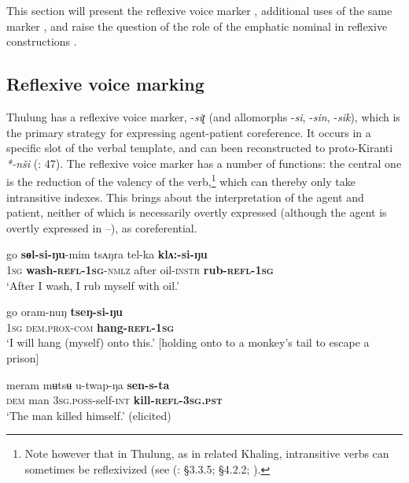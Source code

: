 \documentclass[output=paper]{langscibook}
\begin{document}
This section will present the reflexive voice marker , additional uses of the same marker , and raise the question of the role of the emphatic nominal in reflexive constructions .

\subsection{Reflexive voice marking}
\label{sec:Lahaussois:3.1}

Thulung has a reflexive voice marker, -\textit{siʈ} (and allomorphs -\textit{si}, -\textit{sin}, -\textit{sik}), which is the primary strategy for expressing agent-patient coreference. It occurs in a specific slot of the verbal template, and can been reconstructed to proto-Kiranti \textit{*-nši} (\citealt{VanDriem1990}: 47).  The reflexive voice marker has a number of functions: the central one is the reduction of the valency of the verb,\footnote{Note however that in Thulung, as in related Khaling, intransitive verbs can sometimes be reflexivized (see (\citealt{Lahaussois2016}: §3.3.5; \citealt{JacquesEtAl2016}§4.2.2; \citealt{Jacques2015}).} which can thereby only take intransitive indexes. This brings about the interpretation of the agent and patient, neither of which is necessarily overtly expressed (although the agent is overtly expressed in --), as coreferential.

\ea%
    \label{ex:Lahaussois:7}
    \gll go \textbf{sɵl-si-ŋu}{}-mim tsʌŋra tel-ka \textbf{klʌ:-si-ŋu}\\
        \textsc{1sg} \textbf{wash-\textsc{refl-1sg}}\textsc{{}-nmlz} after oil-\textsc{instr} \textbf{rub-\textsc{refl-1sg}}\\
    \glt ‘After I wash, I rub myself with oil.'
    \z

           
\ea%
    \label{ex:Lahaussois:8}
    \gll go oram-nuŋ \textbf{tseŋ-si-ŋu}\\
        \textsc{1sg} \textsc{dem.prox-com}   \textbf{hang-\textsc{refl-1sg}}\\
    \glt ‘I will hang (myself) onto this.' [holding onto to a monkey's tail to escape a prison]
    \z

\ea%
    \label{ex:Lahaussois:9}
    \gll meram mʉtsʉ u-twap-ŋa \textbf{sen-s-ta}\\
        \textsc{dem}   man   \textsc{3sg.poss}{}-self-\textsc{int}  \textbf{kill-\textsc{refl-3sg.pst}}\\
    \glt ‘The man killed himself.' (elicited)
    \z
    
\end{document}
